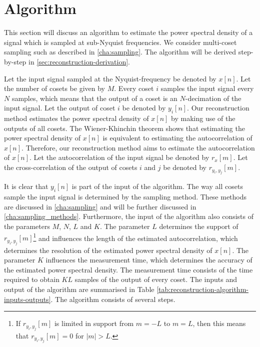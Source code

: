 \documentclass[a4paper, openany, oneside]{memoir}
\begin{document}
\section{Algorithm}
This section will discuss an algorithm to estimate the power spectral density of a signal which is sampled at sub-Nyquist frequencies. We consider multi-coset sampling such as described in \cref{cha:sampling}. The algorithm will be derived step-by-step in \cref{sec:reconstruction-derivation}.

Let the input signal sampled at the Nyquist-frequency be denoted by $x[n]$. Let the number of cosets be given by $M$. Every coset $i$ samples the input signal every $N$ samples, which means that the output of a coset is an $N$-decimation of the input signal. Let the output of coset $i$ be denoted by $y_i[n]$. Our reconstruction method estimates the power spectral density of $x[n]$ by making use of the outputs of all cosets. The Wiener-Khinchin theorem shows that estimating the power spectral density of $x[n]$ is equivalent to estimating the autocorrelation of $x[n]$. Therefore, our reconstruction method aims to estimate the autocorrelation of $x[n]$. Let the autocorrelation of the input signal be denoted by $r_x[m]$. Let the cross-correlation of the output of cosets $i$ and $j$ be denoted by $r_{y_i,y_j}[m]$. 

It is clear that $y_i[n]$ is part of the input of the algorithm. The way all cosets sample the input signal is determined by the sampling method. These methods are discussed in \ref{cha:sampling} and will be further discussed in \ref{cha:sampling_methods}. Furthermore, the input of the algorithm also consists of the parameters $M$, $N$, $L$ and $K$. The parameter $L$ determines the support of $r_{y_i,y_j}[m]$\footnote{If $r_{y_i,y_j}[m]$ is limited in support from $m=-L$ to $m=L$, then this means that $r_{y_i,y_j}[m]=0$ for $|m|>L$.} and influences the length of the estimated autocorrelation, which determines the resolution of the estimated power spectral density of $x[n]$. The parameter $K$ influences the measurement time, which determines the accuracy of the estimated power spectral density. The measurement time consists of the time required to obtain $KL$ samples of the output of every coset. The inputs and output of the algorithm are summarised in Table \ref{tab:reconstruction-algorithm-inputs-outputs}. The algorithm consists of several steps.
\end{document}
